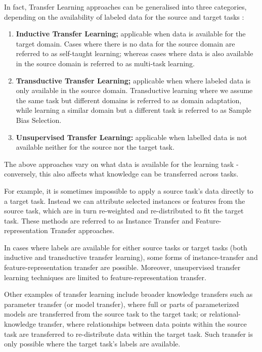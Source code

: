 In fact, Transfer Learning approaches can be generalised into three categories, depending on the availability of labeled data for the source and target tasks \citep{panyang2010}:
\begin{enumerate}  
\item \textbf{Inductive Transfer Learning;} applicable when data is available for the target domain. Cases where there is no data for the source domain are referred to as self-taught learning; whereas cases where data is also available in the source domain is referred to as multi-task learning.

\newpage

\item \textbf{Transductive Transfer Learning;} applicable when where labeled data is only available in the source domain. Transductive learning where we assume the same task but different domains is referred to as domain adaptation, while learning a similar domain but a different task is referred to as Sample Bias Selection.  

\item \textbf{Unsupervised Transfer Learning:} applicable when labelled data is not available neither for the source nor the target task.
\end{enumerate}

The above approaches vary on what data is available for the learning task - conversely, this also affects what knowledge can be transferred across tasks. 

For example, it is sometimes impossible to apply a source task's data directly to a target task. Instead we can attribute selected instances or features from the source task, which are in turn re-weighted and re-distributed to fit the target task. These methods are referred to as Instance Transfer and Feature-representation Transfer approaches.

In cases where labels are available for either source tasks or target tasks (both inductive and transductive transfer learning), some forms of instance-transfer and feature-representation transfer are possible. Moreover, unsupervised transfer learning techniques are limited to feature-representation transfer. \citep{panyang2010}

Other examples of transfer learning include broader knowledge transfers such as parameter transfer (or model transfer), where full or parts of parameterized models are transferred from the source task to the target task; or relational-knowledge transfer, where relationships between data points within the source task are transferred to re-distribute data within the target task. \citep{cook2013}  Such transfer is only possible where the target task's labels are available.


